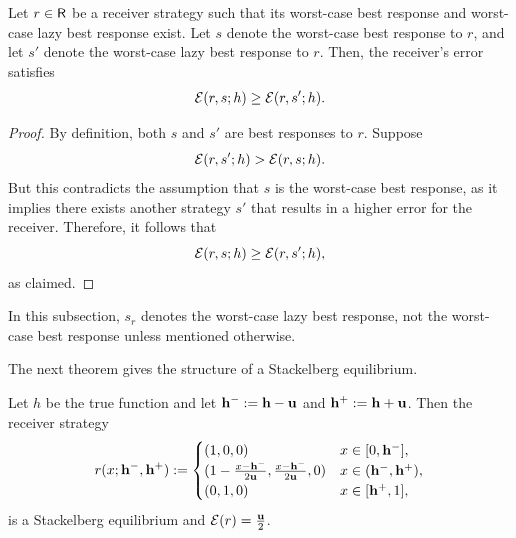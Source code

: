 \begin{proposition}\label{prop:comparing sender strategy types}
    Let $r \in \mathsf{R}$ be a receiver strategy such that its worst-case best response and worst-case lazy best response exist. Let $s$ denote the worst-case best response to $r$, and let $s'$ denote the worst-case lazy best response to $r$. Then, the receiver's error satisfies
    \[
    \mathcal{E}(r, s; h) \geq \mathcal{E}(r, s'; h).
    \]
\end{proposition}

\begin{proof}
    By definition, both $s$ and $s'$ are best responses to $r$. Suppose
    \[
    \mathcal{E}(r, s'; h) > \mathcal{E}(r, s; h).
    \]
    But this contradicts the assumption that $s$ is the worst-case best response, as it implies there exists another strategy $s'$ that results in a higher error for the receiver.
    Therefore, it follows that
    \[
    \mathcal{E}(r, s; h) \geq \mathcal{E}(r, s'; h),
    \]
    as claimed.
\end{proof}


\begin{notn}
In this subsection, $s_r$ denotes the worst-case lazy best response, not the worst-case best response unless mentioned otherwise.
\end{notn}
The next theorem gives the structure of a Stackelberg equilibrium.

\begin{thm}\label{thm:Stochastic Stackelberg equilibrium}
Let $h$ be the true function and let $\mathbf{h^{-}} := \mathbf{h} - \mathbf{u}$ and $\mathbf{h^{+}} := \mathbf{h} + \mathbf{u}$. Then the receiver strategy
\begin{equation}\label{eqn:stochastic_stackelberg}
		r(x;\mathbf{h^{-}},\mathbf{h^{+}}) := \begin{cases}
			(1,0,0) & x \in [0, \mathbf{h^{-}}], \\
			(1-\frac{x-\mathbf{h^{-}}}{2\mathbf{u}},\frac{x-\mathbf{h^{-}}}{2\mathbf{u}},0) & x \in (\mathbf{h^{-}},\mathbf{h^{+}}), \\
			(0,1,0) & x \in [\mathbf{h^{+}},1],
		\end{cases}
	\end{equation}
is a Stackelberg equilibrium and $\mathcal{E}(r) = \frac{\mathbf{u}}{2}$.
\end{thm}







